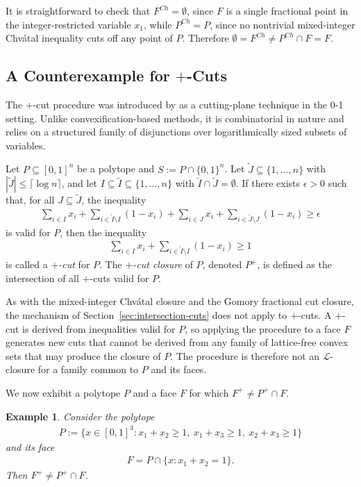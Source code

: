 \documentclass{article}
\newtheorem{example}{Example}
\renewcommand{\L}{\mathcal{L}}
\newcommand{\ceil}[1]{\lceil #1 \rceil}
\begin{document}
It is straightforward to check that $F^{Ch} = \emptyset$, since $F$ is a single fractional point in the integer-restricted variable $x_1$, while $P^{Ch} = P$, since no nontrivial mixed-integer Chv\'atal inequality cuts off any point of $P$. Therefore $\emptyset = F^{Ch} \neq P^{Ch} \cap F = F$.

\subsection{A Counterexample for \texorpdfstring{$+$}{+}-Cuts} \label{subsec:counter-pluscut}

The $+$-cut procedure was introduced by \cite{pokutta2010rank} as a cutting-plane technique in the 0-1 setting. Unlike convexification-based methods, it is combinatorial in nature and relies on a structured family of disjunctions over logarithmically sized subsets of variables.

Let $P \subseteq [0,1]^n$ be a polytope and $S := P \cap \{0,1\}^n$. Let $\tilde J \subseteq \{1,\ldots,n\}$ with $|\tilde J| \leq \ceil{\log n}$, and let $I \subseteq \tilde I \subseteq \{1,\ldots,n\}$ with $\tilde I \cap \tilde J = \emptyset$.
If there exists $\epsilon > 0$ such that, for all $J \subseteq \tilde J$, the inequality
\begin{align}
    \sum_{i \in I} x_i + \sum_{i \in \tilde I \setminus I} (1 - x_i) + \sum_{i \in J} x_i + \sum_{i \in \tilde J \setminus J} (1 - x_i) \geq \epsilon
\end{align}
is valid for $P$, then the inequality
\begin{align}
    \sum_{i \in I} x_i + \sum_{i \in \tilde I \setminus I} (1 - x_i) \geq 1
\end{align}
is called a \emph{$+$-cut} for $P$.
The \emph{$+$-cut closure} of $P$, denoted $P^+$, is defined as the intersection of all $+$-cuts valid for $P$.

As with the mixed-integer Chv\'atal closure and the Gomory fractional cut closure, the mechanism of Section~\ref{sec:intersection-cuts} does not apply to $+$-cuts. A $+$-cut is derived from inequalities valid for $P$, so applying the procedure to a face $F$ generates new cuts that cannot be derived from any family of lattice-free convex sets that may produce the closure of $P$. The procedure is therefore not an $\L$-closure for a family common to $P$ and its faces.

We now exhibit a polytope $P$ and a face $F$ for which $F^+ \neq P^+ \cap F$.

\begin{example}
    Consider the polytope
    \begin{align}
        P := \{x \in [0,1]^3: x_1 + x_2 \geq 1, \ x_1 + x_3 \geq 1, \ x_2 + x_3 \geq 1\}
    \end{align}
    and its face
    \begin{align}
        F = P \cap \{x : x_1 + x_2 = 1\}.
    \end{align}
    Then $F^{+} \neq P^{+} \cap F$.
\end{example}
\end{document}
